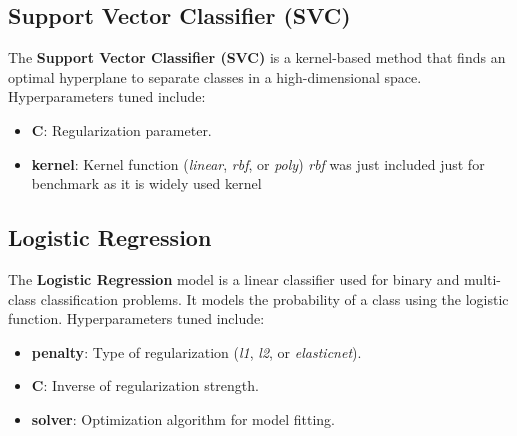 \documentclass{article}
\begin{document}
\subsection{Support Vector Classifier (SVC)}
The \textbf{Support Vector Classifier (SVC)} is a kernel-based method that finds an optimal hyperplane to separate classes in a high-dimensional space. Hyperparameters tuned include:
\begin{itemize}
    \item \textbf{C}: Regularization parameter.
    \item \textbf{kernel}: Kernel function (\textit{linear}, \textit{rbf}, or \textit{poly})  \textit{rbf} was just included 
    just for benchmark as it is widely used kernel
\end{itemize}

\begin{table}[H]
    \centering
    \caption{SVC Grid Search Results}
    \label{tab:table}
\end{table}
    

\subsection{Logistic Regression}
The \textbf{Logistic Regression} model is a linear classifier used for binary and multi-class classification problems. It models the probability of a class using the logistic function. Hyperparameters tuned include:
\begin{itemize}
    \item \textbf{penalty}: Type of regularization (\textit{l1}, \textit{l2}, or \textit{elasticnet}).
    \item \textbf{C}: Inverse of regularization strength.
    \item \textbf{solver}: Optimization algorithm for model fitting.
\end{itemize}
\end{document}
